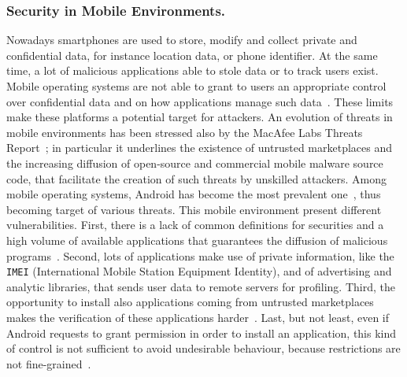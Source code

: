\documentclass{llncs}
\begin{document}
\subsubsection{Security in Mobile Environments.}
Nowadays smartphones are used to store, modify and collect private and confidential data, for instance location data, or phone identifier. At the same time, a lot of malicious applications able to stole data or to track users exist. Mobile operating systems are not able to grant to users an appropriate control over confidential data and on how applications manage such data~\cite{Enck:2014:TIT:2642648.2619091}. These limits make these platforms a potential target for attackers. An evolution of threats in mobile environments has been stressed also by the MacAfee Labs Threats Report~\cite{McAfee_threat}; in particular it underlines the existence of untrusted marketplaces and the increasing diffusion of open-source and commercial mobile malware source code, that facilitate the creation of such threats by unskilled attackers.
Among mobile operating systems, Android has become the most prevalent one~\cite{idc_phonetrack}, thus becoming target of various threats. This mobile environment present different vulnerabilities. First, there is a lack of common definitions for securities and a high volume of available applications that guarantees the diffusion of malicious programs~\cite{Enck11astudy}. Second, lots of applications make use of private information, like the \texttt{IMEI} (International Mobile Station Equipment Identity), and of advertising and analytic libraries, that sends user data to remote servers for profiling. Third, the opportunity to install also applications coming from untrusted marketplaces makes the verification of these applications harder~\cite{TUD-CS-2014-0849}. Last, but not least, even if Android requests to grant permission in order to install an application, this kind of control is not sufficient to avoid undesirable behaviour, because restrictions are not fine-grained~\cite{fritz2013highly,Hornyack}.
\end{document}
